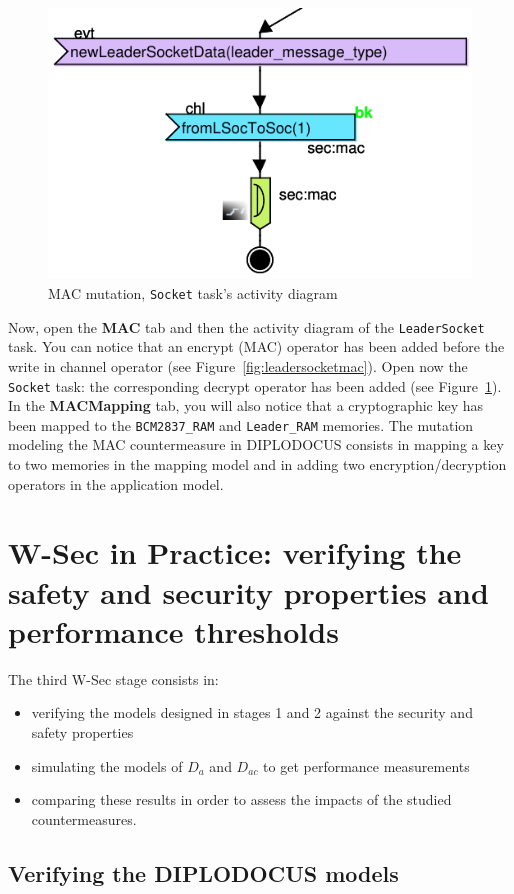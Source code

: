 \documentclass{article}
\begin{document}
\begin{figure}
	\centering
	\includegraphics[width=.5\textwidth]{figures/socketmac.pdf}
	\caption{MAC mutation, \texttt{Socket} task's activity diagram}
	\label{fig:socketmac}
\end{figure}

Now, open the \textbf{MAC} tab and then the activity diagram of the \texttt{LeaderSocket} task. You can notice that an encrypt (MAC) operator has been added before the write in channel operator (see Figure~\ref{fig:leadersocketmac}). Open now the \texttt{Socket} task: the corresponding decrypt operator has been added (see Figure~\ref{fig:socketmac}). In the \textbf{MACMapping} tab, you will also notice that a cryptographic key has been mapped to the \texttt{BCM2837\_RAM} and \texttt{Leader\_RAM} memories. The mutation modeling the MAC countermeasure in DIPLODOCUS consists in mapping a key to two memories in the mapping model and in adding two encryption/decryption operators in the application model.


\section{W-Sec in Practice: verifying the safety and security properties and performance thresholds}

The third W-Sec stage consists in:
\begin{itemize}
	\item verifying the models designed in stages 1 and 2 against the security and safety properties
	\item simulating the models of $D_a$ and $D_{a c}$ to get performance measurements
	\item comparing these results in order to assess the impacts of the studied countermeasures.
\end{itemize}

\subsection{Verifying the DIPLODOCUS models}
\end{document}
